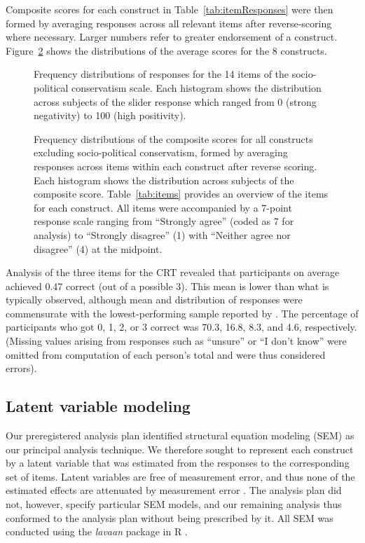 \documentclass[fignum,man]{apa}\usepackage[]{graphicx}\usepackage[]{color}
\begin{document}
Composite scores for each construct in Table~\ref{tab:itemResponses}
 were then formed by averaging 
responses across
all relevant items after reverse-scoring where necessary. 
Larger numbers refer to greater endorsement of a construct. 
Figure~\ref{fig:histoSocDarw} shows the distributions 
of the average scores for the 8 constructs. 
\begin{figure}[tp] %
	\caption{Frequency distributions of responses for the
		14 items of the socio-political conservatism scale.
		Each histogram shows the distribution
		across subjects of the slider response which
		ranged from 0 (strong negativity) to 100 (high positivity). }
	\label{fig:slidersSocDarw}
\end{figure}

\begin{figure}[tp] %
	\caption{Frequency distributions of the composite scores for all constructs
		excluding socio-political conservatism,
		formed by averaging responses across items within each construct 
		after
		reverse scoring. Each histogram shows the distribution
		across subjects of the composite score. 		
		Table~\ref{tab:items} provides an overview of the items for
		each construct. All items were accompanied by a 7-point 
		response scale ranging 
		from ``Strongly agree'' (coded as 7 for analysis) to
		 ``Strongly disagree'' (1) with ``Neither agree nor disagree'' (4)
		at the midpoint. }
	\label{fig:histoSocDarw}
\end{figure}

Analysis of the three items for the CRT revealed that participants on average
achieved 0.47 correct (out of a possible 3).
This mean is lower than what is typically observed, although
mean and distribution of responses were commensurate with the lowest-performing
sample reported by .
The percentage of participants who got 0, 1, 2, or 3 correct was 
70.3, 16.8, 8.3,
and 4.6, respectively. (Missing values
arising from responses such as ``unsure'' or ``I don't know'' were omitted from computation
of each person's total and were thus considered errors).

\subsection{Latent variable modeling}
Our
preregistered analysis plan identified structural equation modeling (SEM)
as our principal analysis technique. 
We therefore sought to represent each construct by a 
latent variable that was estimated from the 
responses to the corresponding set of items. 
Latent variables are free of measurement error, and thus none of the estimated effects 
are attenuated by measurement error \cite{Coffman05}. 
The analysis plan did not, however, 
specify particular SEM models, and our 
remaining analysis 
thus conformed to the analysis plan without being 
 prescribed by it.
 All SEM was conducted using the \textit{lavaan} package in R \cite{Rosseel12}.
\end{document}
